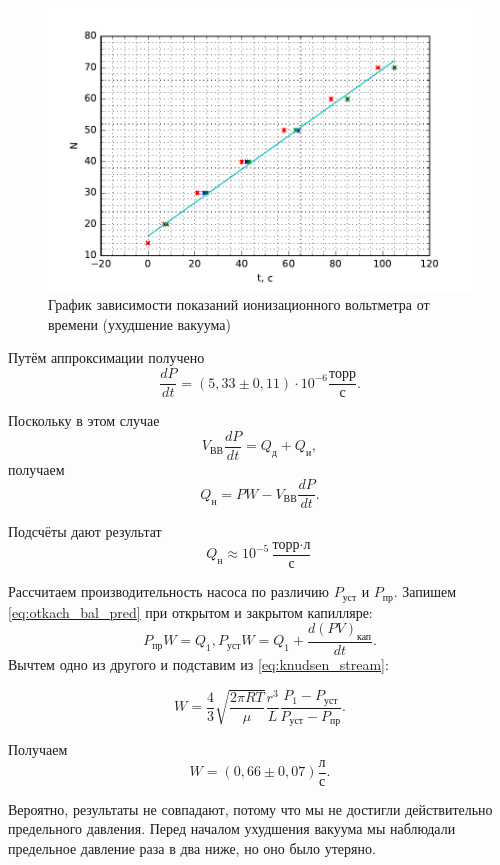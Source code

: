 \documentclass[12pt]{article}
\begin{document}
	\begin{figure}[!h]
		\caption{График зависимости показаний ионизационного вольтметра от времени (ухудшение вакуума)}
		\label{graph_uh}
		\begin{center}
		\includegraphics[scale=.8]{graph1.pdf}
		\end{center}
	\end{figure}
	
	Путём аппроксимации получено $$ \frac{dP}{dt}=(5{,}33\pm 0{,}11) \cdot 10^{-6} \frac{\text{торр}}{\text{с}}. $$
	
	Поскольку в этом случае $$ V_\text{ВВ} \frac{dP}{dt} = Q_\text{д}+Q_\text{и}, $$ получаем $$ Q_\text{н}=PW-V_\text{ВВ} \frac{dP}{dt}. $$
	
	Подсчёты дают результат $$ Q_\text{н} \approx 10^{-5} \frac{\text{торр} \cdot \text{л}}{\text{с}} $$
	
	Рассчитаем производительность насоса по различию $P_\text{уст}$ и $P_\text{пр}$. Запишем \eqref{eq:otkach_bal_pred} при открытом и закрытом капилляре: $$ P_\text{пр} W=Q_1, P_\text{уст} W = Q_1+\frac{d(PV)_\text{кап}}{dt}. $$ Вычтем одно из другого и подставим из \eqref{eq:knudsen_stream}:
	
	\begin{equation}
		\label{eq:otkach_by_pred_ust}
		W = \frac{4}{3} \sqrt{\frac{2\pi RT}{\mu}} \frac{r^3}{L} \frac{P_1-P_\text{уст}}{P_\text{уст} - P_\text{пр}}.
	\end{equation}
	
	Получаем $$ W=(0{,}66\pm 0{,}07) \frac{\text{л}}{\text{с}}. $$
	
	Вероятно, результаты не совпадают, потому что мы не достигли действительно предельного давления. Перед началом ухудшения вакуума мы наблюдали предельное давление раза в два ниже, но оно было утеряно.
	
\end{document}
